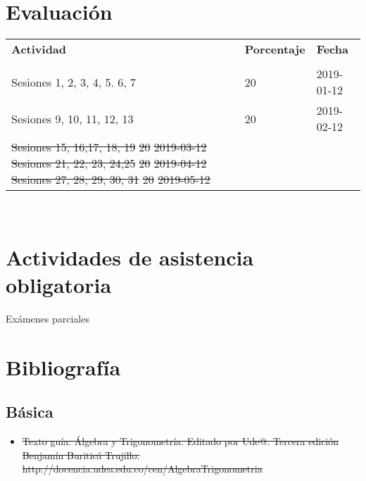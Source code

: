 \documentclass[11pt]{article}
\providecommand{\DIFaddtex}[1]{{\protect\color{blue}\uwave{#1}}} %
\providecommand{\DIFdeltex}[1]{{\protect\color{red}\sout{#1}}}                      %
\providecommand{\DIFaddbegin}{} %
\providecommand{\DIFaddend}{} %
\providecommand{\DIFdelbegin}{} %
\providecommand{\DIFdelend}{} %
\providecommand{\DIFadd}[1]{\texorpdfstring{\DIFaddtex{#1}}{#1}} %
\providecommand{\DIFdel}[1]{\texorpdfstring{\DIFdeltex{#1}}{}} %
\newcommand{\DIFscaledelfig}{0.5}
\newlength{\DIFdelgraphicswidth} %
\newlength{\DIFdelgraphicsheight} %
\newcommand{\DIFaddincludegraphics}[2][]{{\color{blue}\fbox{\DIFOincludegraphics[#1]{#2}}}} %
\newcommand{\DIFdelincludegraphics}[2][]{%
\sbox{\DIFdelgraphicsbox}{\DIFOincludegraphics[#1]{#2}}%
\settoboxwidth{\DIFdelgraphicswidth}{\DIFdelgraphicsbox} %
\settoboxtotalheight{\DIFdelgraphicsheight}{\DIFdelgraphicsbox} %
\scalebox{\DIFscaledelfig}{%
\parbox[b]{\DIFdelgraphicswidth}{\usebox{\DIFdelgraphicsbox}\\[-\baselineskip] \rule{\DIFdelgraphicswidth}{0em}}\llap{\resizebox{\DIFdelgraphicswidth}{\DIFdelgraphicsheight}{%
\setlength{\unitlength}{\DIFdelgraphicswidth}%
\begin{picture}(1,1)%
\thicklines\linethickness{2pt} %
{\color[rgb]{1,0,0}\put(0,0){\framebox(1,1){}}}%
{\color[rgb]{1,0,0}\put(0,0){\line( 1,1){1}}}%
{\color[rgb]{1,0,0}\put(0,1){\line(1,-1){1}}}%
\end{picture}%
}\hspace*{3pt}}} %
} %
\DeclareRobustCommand{\DIFaddbegin}{\DIFOaddbegin \let\includegraphics\DIFaddincludegraphics} %
\DeclareRobustCommand{\DIFaddend}{\DIFOaddend \let\includegraphics\DIFOincludegraphics} %
\DeclareRobustCommand{\DIFdelbegin}{\DIFOdelbegin \let\includegraphics\DIFdelincludegraphics} %
\DeclareRobustCommand{\DIFdelend}{\DIFOaddend \let\includegraphics\DIFOincludegraphics} %
\begin{document}
\section*{Evaluación}
\noindent \begin{tabular}{R{0.5\textwidth} C{0.2\textwidth} C{0.2\textwidth}}
	\toprule
	\textbf{Actividad} & \textbf{Porcentaje} & \textbf{Fecha} \\
	\\
	\midrule
	Sesiones 1, 2, 3, 4, 5. 6, 7 & 20 & 2019-01-12 \\ Sesiones 9, 10, 11, 12, 13 & 20 & 2019-02-12 \\ 
	\DIFdelbegin \DIFdel{Sesiones 15, 16,17, 18, 19 }%
\DIFdel{20 }%
\DIFdel{2019-03-12 }%
\DIFdel{Sesiones 21, 22, 23, 24,25 }%
\DIFdel{20 }%
\DIFdel{2019-04-12 }%
\DIFdel{Sesiones 27, 28, 29, 30, 31 }%
\DIFdel{20 }%
\DIFdel{2019-05-12 }%
\DIFdelend \\
	\midrule
\end{tabular}
\\
\section*{Actividades de asistencia obligatoria}

Exámenes parciales

\section*{Bibliografía}

\subsection*{Básica}

\begin{itemize}
\item \DIFdelbegin \DIFdel{Texto guía: Álgebra y Trigonometría. Editado por Ude@. Tercera edición Benjamín Buriticá Trujillo. http://docencia.udea.edu.co/cen/AlgebraTrigonometria 
}\DIFdelend \DIFaddbegin \DIFadd{basica 1 
}\DIFaddend \end{itemize}
\end{document}

